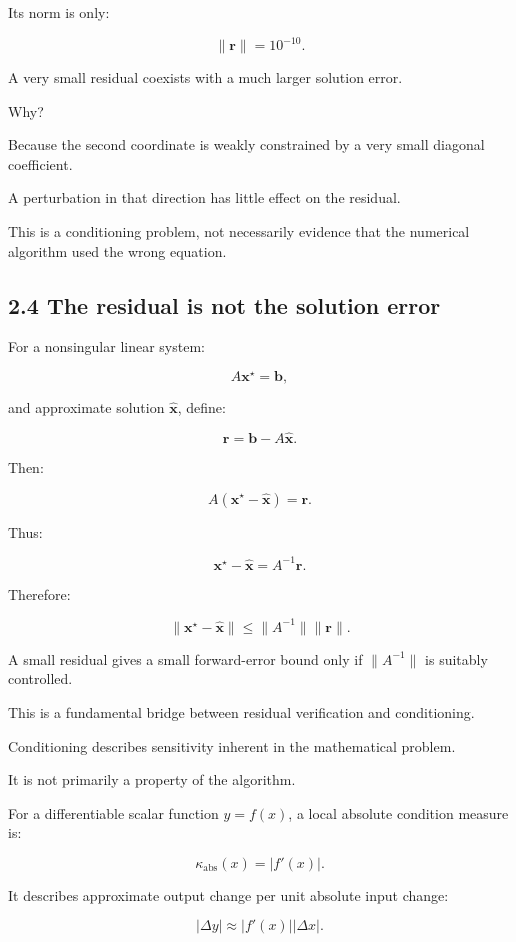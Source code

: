 Its norm is only:

\[ \boxed{\|\mathbf r\|=10^{-10}}. \]

A very small residual coexists with a much larger solution error.

Why?

Because the second coordinate is weakly constrained by a very small diagonal coefficient.

A perturbation in that direction has little effect on the residual.

This is a conditioning problem, not necessarily evidence that the numerical algorithm used the wrong equation.

\subsection{2.4 The residual is not the solution error}\label{02-foundations-ii-ch028-the-residual-is-not-the-solution-error}

For a nonsingular linear system:

\[ A\mathbf x^\star=\mathbf b, \]

and approximate solution \(\hat{\mathbf x}\), define:

\[ \mathbf r=\mathbf b-A\hat{\mathbf x}. \]

Then:

\[ A(\mathbf x^\star-\hat{\mathbf x})=\mathbf r. \]

Thus:

\[ \mathbf x^\star-\hat{\mathbf x} = A^{-1}\mathbf r. \]

Therefore:

\[ \boxed{ \|\mathbf x^\star-\hat{\mathbf x}\| \le \|A^{-1}\|\|\mathbf r\| }. \]

A small residual gives a small forward-error bound only if \(\|A^{-1}\|\) is suitably controlled.

This is a fundamental bridge between residual verification and conditioning.

Conditioning describes sensitivity inherent in the mathematical problem.

It is not primarily a property of the algorithm.

For a differentiable scalar function \(y=f(x)\), a local absolute condition measure is:

\[ \boxed{ \kappa_{\mathrm{abs}}(x)=|f'(x)| }. \]

It describes approximate output change per unit absolute input change:

\[ |\Delta y|\approx|f'(x)||\Delta x|. \]

